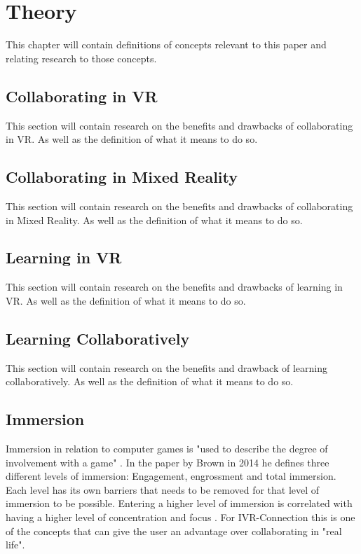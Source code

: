 \chapter{Theory} %
This chapter will contain definitions of concepts relevant to this paper and relating research to those concepts. %
    \section{Collaborating in VR} %
    This section will contain research on the benefits and drawbacks of collaborating in VR. As well as the definition of what it means to do so.
    
    \section{Collaborating in Mixed Reality}
    This section will contain research on the benefits and drawbacks of collaborating in Mixed Reality. As well as the definition of what it means to do so.
    
    \section{Learning in VR} %
    This section will contain research on the benefits and drawbacks of learning in VR. As well as the definition of what it means to do so.
    
    \section{Learning Collaboratively} %
    This section will contain research on the benefits and drawback of learning collaboratively. As well as the definition of what it means to do so.
    
    \section{Immersion} %
    Immersion in relation to computer games is "used to describe the degree of involvement with a game" \cite{Brown2004}. In the paper by Brown in 2014 he defines three different levels of immersion: Engagement, engrossment and total immersion. Each level has its own barriers that needs to be removed for that level of immersion to be possible. Entering a higher level of immersion is correlated with having a higher level of concentration and focus \cite{Jennett2008}. For IVR-Connection this is one of the concepts that can give the user an advantage over collaborating in "real life".
    
